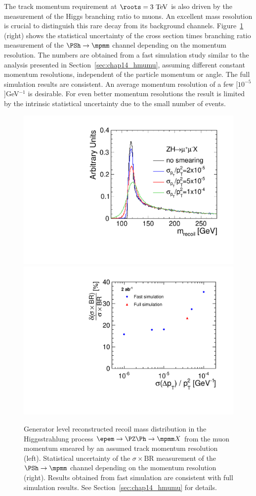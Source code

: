 The track momentum requirement at $\roots=3~\mathrm{TeV}$ is also driven by the measurement
of the Higgs branching ratio to muons. An excellent mass resolution is crucial to distinguish
this rare decay from its background channels. Figure~\ref{fig:chap3:Higgs_mumu_momres_dependence} (right)
shows the statistical uncertainty of the cross section times branching ratio measurement
of the $\PSh \to \mpmm$ channel depending on the momentum resolution. The numbers are obtained from
a fast simulation study similar to the analysis presented in Section~\ref{sec:chap14_hmumu}, assuming
different constant momentum resolutions, independent of the particle momentum or angle.
The full simulation results are consistent. An average momentum resolution of a few
\unit[$10^{-5}$]{GeV$^{-1}$} is desirable. For even better momentum resolutions the result is limited
by the intrinsic statistical uncertainty due to the small number of events.

\begin{figure}[hbt]
\centering
\includegraphics[width=0.49\linewidth]{../Chap3_ExpCond_PhysPerfsReqs/higgs.pdf} 
\hfill
\includegraphics[width=0.49\linewidth]{../Chap3_ExpCond_PhysPerfsReqs/higgs_mumu_momres_dependence_2ab.pdf} 
\caption{Generator level reconstructed recoil mass distribution in the
Higgsstrahlung process $\epem\rightarrow\PZ\Ph\rightarrow\mpmm X$ from the
  muon momentum smeared by an assumed track momentum resolution (left). Statistical uncertainty 
  of the $\sigma\times\mathrm{BR}$ measurement of the $\PSh \to \mpmm$ channel
  depending on the momentum resolution (right). Results obtained from fast simulation are consistent with full simulation results.
  See Section~\ref{sec:chap14_hmumu} for details.
\label{fig:chap3:Higgs_mumu_momres_dependence}}
\end{figure}

